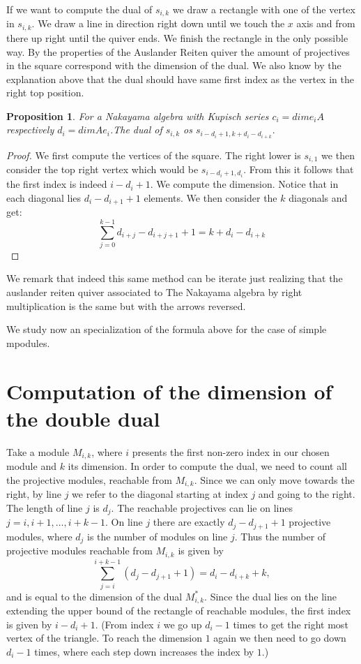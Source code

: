 \documentclass[12pt, a4paper]{article}
\numberwithin{equation}{section}
\theoremstyle{definition}
\theoremstyle{plain}
\newtheorem{proposition}[definition]{Proposition}
\theoremstyle{remark}
\begin{document}
If we want to compute the dual of $s_{i,k}$ we draw a rectangle with one of the vertex in $s_{i,k}.$ We draw a line in direction right down until we touch the $x$ axis and from there up right until the quiver ends. We finish the rectangle in the only possible way. By the properties of the Auslander Reiten quiver the amount of projectives in the square correspond with the dimension of the dual. We also know by the explanation above that the dual should have same first index as the vertex in the right top position.
\begin{proposition}
    For a Nakayama algebra with Kupisch series $c_i=dime_iA$ respectively $d_i=dim Ae_i$.The dual of $s_{i,k}$ os $s_{i-d_i+1,k+d_i-d_{i+k}}.$
\end{proposition}
\begin{proof}
    We first compute the vertices of the square. The right lower is $s_{i,1}$ we then consider the top right vertex which would be $s_{i-d_{i}+1,d_{i}}.$ From this it follows that the first index is indeed $i-d_i+1.$ We compute the dimension. Notice that in each diagonal lies $d_{i}-d_{i+1}+1$ elements. We then consider the $k$ diagonals and get:
    $$\sum_{j=0}^{k-1} d_{i+j}-d_{i+j+1}+1=k+d_i-d_{i+k}$$
\end{proof}
We remark that indeed this same method can be iterate just realizing that the auslander reiten quiver associated to The Nakayama algebra by right multiplication is the same but with the arrows reversed. 



We study now an specialization of the formula above for the case of simple mpodules.
\section{Computation of the dimension of the double dual}
Take a module $M_{i,k}$, where $i$ presents the first non-zero index in our chosen module and $k$ its dimension. 
In order to compute the dual, we need to count all the projective modules, reachable from $M_{i,k}$. 
Since we can only move towards the right, by line $j$ we refer to the diagonal starting at index $j$ and going to the right. The length of line $j$ is $d_j$.
The reachable projectives can lie on lines $j = i, i+1, \dots, i+k-1$.
On line $j$ there are exactly $d_j - d_{j+1} + 1$ projective modules, where $d_j$ is the number of modules on line $j$.
Thus the number of projective modules reachable from $M_{i,k}$ is given by
\begin{equation}
\label{eq:reachable}
\sum_{j=i}^{i+k-1} (d_j - d_{j+1} + 1) = d_i - d_{i+k} + k,
\end{equation}
and is equal to the dimension of the dual $M^*_{i,k}$.
Since the dual lies on the line extending the upper bound of the rectangle of reachable modules, the first index is given by $i - d_i + 1$.
(From index $i$ we go up $d_i - 1$ times to get the right most vertex of the triangle. To reach the dimension $1$ again we then need to go down $d_i - 1$ times, where each step down increases the index by $1$.)
\end{document}
